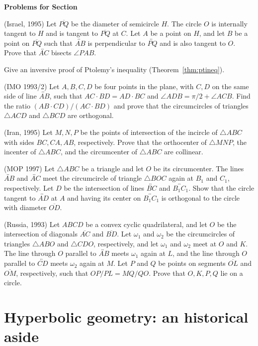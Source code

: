 \documentclass[12pt]{book}
\newcounter{exc}
\numberwithin{exc}{section}
\numberwithin{figure}{section}
\newenvironment{exer}{\vspace{0.1in}
\noindent \textbf{Problems for Section~\thesection} \vspace{0.1in}
\begin{list}{\arabic{exc}.}{\usecounter{exc}}}{\end{list}}
\numberwithin{equation}{theorem}
\def\ii{\item}
\def\line#1{\overleftrightarrow{#1}}
\def\seg#1{\overline{#1}}
\begin{document}
\begin{exer}
\ii
(Israel, 1995)
Let $\seg{PQ}$ be the diameter of semicircle $H$. The circle $O$ is 
internally tangent to $H$ and is tangent to $\seg{PQ}$ at $C$. Let $A$
be a point on $H$, and let $B$ be a point on $\seg{PQ}$ 
such that $\line{AB}$ is perpendicular
to $\line{PQ}$ and is also tangent to $O$. Prove that $\line{AC}$ 
bisects $\angle PAB$.

\ii \label{ex:ptineq}
Give an inversive proof of Ptolemy's inequality
(Theorem~\ref{thm:ptineq}).

\ii
(IMO 1993/2)
Let $A,B,C,D$ be four points in the plane, with $C,D$ on the
same side of line $\line{AB}$, such that $AC \cdot BD = AD \cdot BC$
and $\angle ADB = \pi/2 + \angle ACB$. Find the ratio $(AB \cdot
CD)/(AC \cdot BD)$ and prove that the circumcircles of triangles
$\triangle ACD$ and $\triangle BCD$ are orthogonal.

\ii \label{ex:iran95}
(Iran, 1995)
Let $M,N,P$ be the points of intersection of the incircle of
$\triangle ABC$ with sides $BC,CA,AB$, respectively. Prove that
the orthocenter of $\triangle MNP$, the incenter of $\triangle ABC$,
and the circumcenter of $\triangle ABC$ are collinear. 

\ii (MOP 1997) \label{ex:mop97}
Let $\triangle ABC$ be a triangle and let $O$ be
its circumcenter. The lines $\line{AB}$ and
$\line{AC}$  meet the circumcircle of triangle $\triangle 
BOC$ again at $B_1$ and
$C_1$, respectively. Let $D$ be the intersection of lines $\line{BC}$ and
$\line{B_1 C_1}$. Show that the circle tangent to $\line{AD}$ at $A$ and
 having its
center on $\line{B_1C_1}$ is orthogonal to the circle with 
diameter $\seg{OD}$.

\ii
(Russia, 1993) \label{ex:rus93invert}
Let $ABCD$ be a convex cyclic quadrilateral, and let $O$ be the intersection
of diagonals $\seg{AC}$ and $\seg{BD}$. 
Let $\omega_1$ and $\omega_2$ be the circumcircles
of triangles $\triangle ABO$ and $\triangle CDO$, respectively, and let
$\omega_1$ and $\omega_2$ meet at $O$ and $K$. The line through $O$
parallel to $\line{AB}$ 
meets $\omega_1$ again at $L$, and the line through $O$
parallel to $\line{CD}$ meets $\omega_2$ again at $M$.
Let $P$ and $Q$ be points on segments $\seg{OL}$ and 
$\seg{OM}$, respectively, such that
$OP/PL = MQ/QO$. Prove that $O,K,P,Q$ lie on a circle.

\end{exer}

\section{Hyperbolic geometry: an historical aside}
\end{document}
